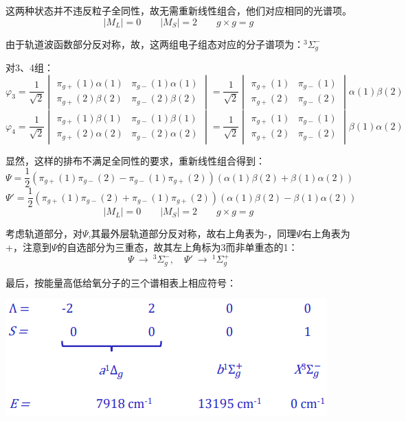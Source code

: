 这两种状态并不违反粒子全同性，故无需重新线性组合，他们对应相同的光谱项。
\[|M_L|=0 \qquad |M_S|=2 \qquad g \times g=g\]

由于轨道波函数部分反对称，故，这两组电子组态对应的分子谱项为：$^3\Sigma_g^-$

对3、4组：
\[
\varphi_3=\frac{1}{\sqrt{2}}
\begin{vmatrix}
    \pi_{g+}(1)\alpha(1) & \pi_{g-}(1)\alpha(1) \\
    \pi_{g+}(2)\beta(2) & \pi_{g-}(2)\beta(2)
\end{vmatrix}
=\frac{1}{\sqrt{2}}
\begin{vmatrix}
    \pi_{g+}(1) & \pi_{g-}(1) \\
    \pi_{g+}(2) & \pi_{g-}(2)
\end{vmatrix}
\alpha(1)\beta(2)
\]
\[
\varphi_4=\frac{1}{\sqrt{2}}
\begin{vmatrix}
    \pi_{g+}(1)\beta(1) & \pi_{g-}(1)\beta(1) \\
    \pi_{g+}(2)\alpha(2) & \pi_{g-}(2)\alpha(2)
\end{vmatrix}
=\frac{1}{\sqrt{2}}
\begin{vmatrix}
    \pi_{g+}(1) & \pi_{g-}(1) \\
    \pi_{g+}(2) & \pi_{g-}(2)
\end{vmatrix}
\beta(1)\alpha(2)
\]

显然，这样的排布不满足全同性的要求，重新线性组合得到：
\[\Psi=\frac{1}{2}(\pi_{g+}(1)\pi_{g-}(2)-\pi_{g-}(1)\pi_{g+}(2))(\alpha(1)\beta(2)+\beta(1)\alpha(2))\]
\[\Psi'=\frac{1}{2}(\pi_{g+}(1)\pi_{g-}(2)+\pi_{g-}(1)\pi_{g+}(2))(\alpha(1)\beta(2)-\beta(1)\alpha(2))\]
\[|M_L|=0 \qquad |M_S|=2 \qquad g \times g=g\]

考虑轨道部分，对$\Psi$,其最外层轨道部分反对称，故右上角表为-，同理$\Psi$右上角表为+，注意到$\Psi$的自选部分为三重态，故其左上角标为3而非单重态的1：
\[\Psi \ \rightarrow \ ^3\Sigma_g^-, \quad \Psi' \ \rightarrow \ ^1\Sigma_g^+\]

最后，按能量高低给氧分子的三个谱相表上相应符号：
\begin{center}
    \includegraphics{fig/lzhx/微信图片_20211106140136.png}
\end{center}

